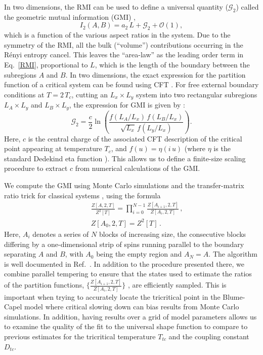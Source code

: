 \documentclass[a4paper,aps,prl,reprint,superscriptaddress,twocolumn,floatfix]{revtex4-1}
\begin{document}
In two dimensions, the RMI can be used to define a universal quantity
($ \mathcal {G}_2 $) called the geometric mutual information (GMI) \cite{stephan2014},
\begin{equation}
I_2 (A, B) = a_2 \,  L +  \mathcal {G}_2  + \mathcal{O} (1), \label{RMI}
\end{equation}
which is a function of the various aspect ratios in the system.
Due to the symmetry of the RMI, all the bulk (``volume'') contributions occurring in the R{\'e}nyi entropy cancel. 
This leaves the ``area-law'' as the leading order term in Eq.~\eqref{RMI}, proportional to $L$, 
which is the length of the boundary between the subregions $A$ and $B$.
In two dimensions, the exact expression for
the partition function of a critical system can be found using CFT \cite{stephan2014,kleban1,kleban2,bondesan,cardy2,fradkin,zalatel,stephan2,eduardo,Singh,cardy3,affleck}. 
For free external boundary conditions at $T = 2 \, T_c $,
cutting an $L_x \times L_y$ system into two rectangular subregions $L_A \times L_y$
and $ L_B \times L_y$, the expression for GMI is given by \cite{stephan2014}:
\begin{equation}
\label{gmi}
\mathcal  G_2 = \frac{c} {2}
\ln \left(
\frac { f (L_A / L_x)  \, f (L_B / L_x) }
{ \sqrt{ L_x }  \, f (L_y / L_x) }
\right ) .
\end{equation}
Here, $c$ is the central charge of the associated CFT description of the critical point appearing at temperature $T_c$, and
$f (u ) = \eta (i \, u)$ (where $\eta $ is the standard Dedekind eta function \cite{stegun}). 
This allows us to define a finite-size scaling procedure to extract $c$ from numerical calculations 
of the GMI.



We compute the GMI using Monte Carlo simulations and the transfer-matrix ratio trick
for classical systems \cite{gelman1998,tommaso,graph-theory}, using the formula
\begin{eqnarray}
\label{ratio}
&& \frac{  Z [A,2, T] }   {  Z^2 [T] }
= \prod \limits_{i=0}^{N-1}  \frac{  Z [A_{ i+1 } ,2, T] }   {   Z [A_i ,2, T] } \,,\nonumber \\
&& Z [A_0 ,2, T]   = Z^2 [T] \,.
\end{eqnarray}
Here, $A_i$ 
denotes a series of $N$ blocks of increasing size, the consecutive blocks differing by a
one-dimensional strip of spins running parallel to the boundary separating $A$ and $B$, with $ A_0 $ being the empty region and $A_N = A$.
The algorithm is well documented in Ref.~\cite{stephan2014}.  In addition to the procedure presented there, we combine parallel tempering to ensure that the states used to estimate the ratios of the partition functions, $
\Big \lbrace \frac{  Z [A_{ i+1 } ,2, T] }   {   Z [A_i ,2, T] }  \Big \rbrace $ , are efficiently sampled.
This is important when trying to accurately locate the tricritical point in the Blume-Capel model where critical slowing down can bias results from Monte Carlo simulations.
In addition, having results over a grid of model parameters allows us to examine the quality of the fit to the universal shape function to compare to previous estimates for the tricritical temperature $T_{tc}$ and the coupling constant $D_{ tc } $.
\end{document}
